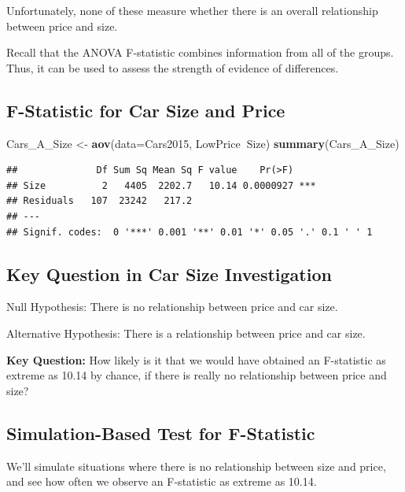 \documentclass[]{book}
\newenvironment{Shaded}{\begin{snugshade}}{\end{snugshade}}
\newcommand{\KeywordTok}[1]{\textcolor[rgb]{0.13,0.29,0.53}{\textbf{#1}}}
\newcommand{\DataTypeTok}[1]{\textcolor[rgb]{0.13,0.29,0.53}{#1}}
\newcommand{\StringTok}[1]{\textcolor[rgb]{0.31,0.60,0.02}{#1}}
\newcommand{\OperatorTok}[1]{\textcolor[rgb]{0.81,0.36,0.00}{\textbf{#1}}}
\newcommand{\NormalTok}[1]{#1}
\begin{document}
Unfortunately, none of these measure whether there is an overall
relationship between price and size.

Recall that the ANOVA F-statistic combines information from all of the
groups. Thus, it can be used to assess the strength of evidence of
differences.

\subsection{F-Statistic for Car Size and
Price}\label{f-statistic-for-car-size-and-price}

\begin{Shaded}
\begin{Highlighting}[]
\NormalTok{Cars_A_Size <-}\StringTok{ }\KeywordTok{aov}\NormalTok{(}\DataTypeTok{data=}\NormalTok{Cars2015, LowPrice}\OperatorTok{~}\NormalTok{Size)}
\KeywordTok{summary}\NormalTok{(Cars_A_Size)}
\end{Highlighting}
\end{Shaded}

\begin{verbatim}
##              Df Sum Sq Mean Sq F value    Pr(>F)    
## Size          2   4405  2202.7   10.14 0.0000927 ***
## Residuals   107  23242   217.2                      
## ---
## Signif. codes:  0 '***' 0.001 '**' 0.01 '*' 0.05 '.' 0.1 ' ' 1
\end{verbatim}

\subsection{Key Question in Car Size
Investigation}\label{key-question-in-car-size-investigation}

Null Hypothesis: There is no relationship between price and car size.

Alternative Hypothesis: There is a relationship between price and car
size.

\textbf{Key Question:} How likely is it that we would have obtained an
F-statistic as extreme as 10.14 by chance, if there is really no
relationship between price and size?

\subsection{Simulation-Based Test for
F-Statistic}\label{simulation-based-test-for-f-statistic}

We'll simulate situations where there is no relationship between size
and price, and see how often we observe an F-statistic as extreme as
10.14.
\end{document}
